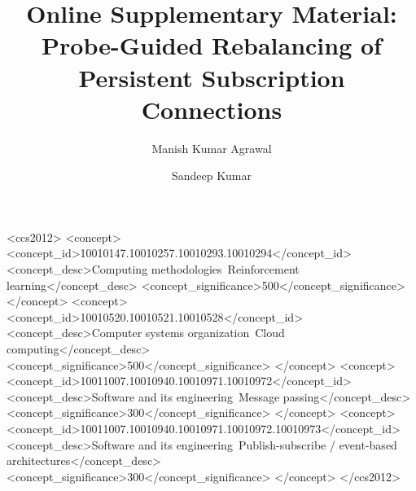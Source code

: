 \documentclass[manuscript,nonacm]{acmart}
\begin{document}
\title[Online Supplementary Material]{Online Supplementary Material: Probe-Guided Rebalancing of Persistent Subscription Connections}

\author{Manish Kumar Agrawal}

\author{Sandeep Kumar}

\begin{CCSXML}
<ccs2012>
 <concept>
  <concept_id>10010147.10010257.10010293.10010294</concept_id>
  <concept_desc>Computing methodologies~Reinforcement learning</concept_desc>
  <concept_significance>500</concept_significance>
 </concept>
 <concept>
  <concept_id>10010520.10010521.10010528</concept_id>
  <concept_desc>Computer systems organization~Cloud computing</concept_desc>
  <concept_significance>500</concept_significance>
 </concept>
 <concept>
  <concept_id>10011007.10010940.10010971.10010972</concept_id>
  <concept_desc>Software and its engineering~Message passing</concept_desc>
  <concept_significance>300</concept_significance>
 </concept>
 <concept>
  <concept_id>10011007.10010940.10010971.10010972.10010973</concept_id>
  <concept_desc>Software and its engineering~Publish-subscribe / event-based architectures</concept_desc>
  <concept_significance>300</concept_significance>
 </concept>
</ccs2012>
\end{CCSXML}

\end{document}
